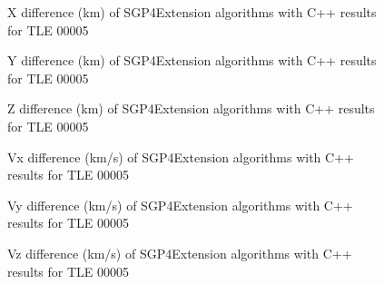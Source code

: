 \documentclass{article}
\begin{document}
\begin{figure}
    
    \caption{X difference (km) of SGP4Extension algorithms with C++ results for TLE 00005}
    \label{fig:dx}
\end{figure}

\begin{figure}
    
    \caption{Y difference (km) of SGP4Extension algorithms with C++ results for TLE 00005}
    \label{fig:dy}
\end{figure}

\begin{figure}
    
    \caption{Z difference (km) of SGP4Extension algorithms with C++ results for TLE 00005}
    \label{fig:dz}
\end{figure}

\begin{figure}
    
    \caption{Vx difference (km/s) of SGP4Extension algorithms with C++ results for TLE 00005}
    \label{fig:dvx}
\end{figure}

\begin{figure}
    
    \caption{Vy difference (km/s) of SGP4Extension algorithms with C++ results for TLE 00005}
    \label{fig:dvy}
\end{figure}

\begin{figure}
    
    \caption{Vz difference (km/s) of SGP4Extension algorithms with C++ results for TLE 00005}
    \label{fig:dvz}
\end{figure}
\end{document}
